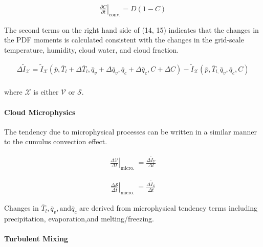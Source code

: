 \begin{eqnarray}
\left.\frac{\partial C}{\partial t}\right|_{\mathrm{conv} .}=D(1-C)
\end{eqnarray}

The second terms on the right hand side of (14, 15) indicates that the changes in the PDF moments is calculated consistent with the changes in the grid-scale temperature, humidity, cloud water, and
cloud fraction.

\begin{eqnarray}
\Delta \tilde{I}_{\mathcal{X}}= \tilde{I}_{\mathcal{X}}\left(\bar{p}, \bar{T}_{l}+\Delta \bar{T}_{l}, \bar{q}_{v}+\Delta \bar{q}_{v}, \bar{q}_{c}+\Delta \bar{q}_{c}, C+\Delta C\right)
-\tilde{I}_{\mathcal{X}}\left(\bar{p}, \bar{T}_{l,} \bar{q}_{v}, \bar{q}_{c}, C\right)
\end{eqnarray}

\begin{eqnarray}
\label{W09-16}
\end{eqnarray} where \(\mathcal{X}\) is either \(\mathcal{V}\) or \(\mathcal{S}\).

\hypertarget{cloud-microphysics}{%
\paragraph{Cloud Microphysics}\label{cloud-microphysics}}

The tendency due to microphysical processes can be written in a similar manner to the cumulus convection effect.

\begin{eqnarray}
\left.\frac{\Delta \mathcal{V}}{\Delta t}\right|_{\text {micro. }}=\frac{\Delta \tilde{I}_{\mathcal{V}}}{\Delta t}
\end{eqnarray}

\begin{eqnarray}
\left.\frac{\Delta \mathcal{S}}{\Delta t}\right|_{\text {micro. }}=\frac{\Delta \tilde{I}_{\mathcal{S}}}{\Delta t}
\end{eqnarray}

Changes in \(\bar{T}_{l}, \bar{q}_{v}, \text{and} \bar{q}_{c}\) are derived from microphysical tendency terms including precipitation, evaporation,and melting/freezing.

\hypertarget{turbulent-mixing}{%
\paragraph{Turbulent Mixing}\label{turbulent-mixing}}


